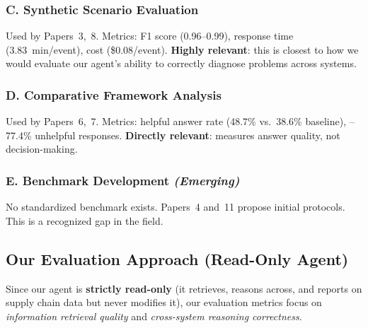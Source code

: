 \documentclass[11pt,a4paper]{article}
\begin{document}
\subsubsection{C. Synthetic Scenario Evaluation}

Used by Papers~3,~8. Metrics: F1 score (0.96--0.99), response time (3.83~min/event), cost (\$0.08/event). \textbf{Highly relevant}: this is closest to how we would evaluate our agent's ability to correctly diagnose problems across systems.

\subsubsection{D. Comparative Framework Analysis}

Used by Papers~6,~7. Metrics: helpful answer rate (48.7\% vs.\ 38.6\% baseline), --77.4\% unhelpful responses. \textbf{Directly relevant}: measures answer quality, not decision-making.

\subsubsection{E. Benchmark Development \textnormal{\textit{(Emerging)}}}

No standardized benchmark exists. Papers~4 and~11 propose initial protocols. This is a recognized gap in the field.

\vspace{1em}

\subsection{Our Evaluation Approach (Read-Only Agent)}

Since our agent is \textbf{strictly read-only} (it retrieves, reasons across, and reports on supply chain data but never modifies it), our evaluation metrics focus on \textit{information retrieval quality} and \textit{cross-system reasoning correctness}.
\end{document}
